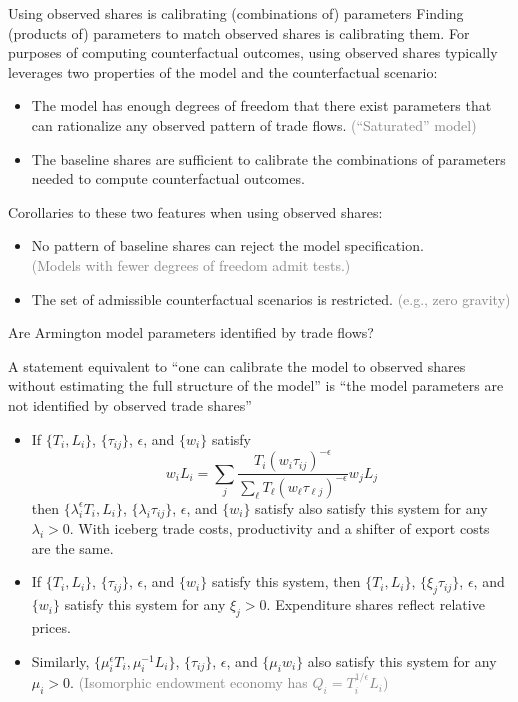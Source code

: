 \documentclass[11pt,notes=hide,aspectratio=169]{beamer}
\begin{document}
\begin{frame}{Using observed shares is calibrating (combinations of) parameters}
Finding (products of) parameters to match observed shares is calibrating them.
\medskip
For purposes of computing counterfactual outcomes, using observed shares typically leverages two properties of the model and the counterfactual scenario:
\begin{itemize}
\item
The model has enough degrees of freedom that there exist parameters that can rationalize any observed pattern of trade flows.
\textcolor{gray}{(``Saturated'' model)}
\item
The baseline shares are sufficient to calibrate the combinations of parameters needed to compute counterfactual outcomes.
\end{itemize}
\medskip
Corollaries to these two features when using observed shares:
\begin{itemize}
\item
No pattern of baseline shares can reject the model specification.\\
\textcolor{gray}{(Models with fewer degrees of freedom admit tests.)}
\item
The set of admissible counterfactual scenarios is restricted.
\textcolor{gray}{(e.g., zero gravity)}
\end{itemize}
\end{frame}
\begin{frame}{Are Armington model parameters identified by trade flows?}
{\small
A statement equivalent to
``one can calibrate the model to observed shares without estimating the full structure of the model''
is
``the model parameters are not identified by observed trade shares''
\begin{itemize}
\item
If $\{T_i,L_i\}$, $\{\tau_{ij}\}$, $\epsilon$, and $\{w_i\}$ satisfy
$$
w_i L_i
=
\sum_j \frac{T_i \left(w_i \tau_{ij}\right)^{-\epsilon}}{\sum_{\ell} T_{\ell} \left(w_{\ell} \tau_{\ell j}\right)^{-\epsilon}}
w_j L_j
$$
then
$\{\lambda_i^{\epsilon}T_i,L_i\}$, $\{\lambda_i\tau_{ij}\}$, $\epsilon$, and $\{w_i\}$ satisfy
also satisfy this system
for any $\lambda_{i} > 0$.
With iceberg trade costs, productivity and a shifter of export costs are the same.
\item
If $\{T_i,L_i\}$, $\{\tau_{ij}\}$, $\epsilon$, and $\{w_i\}$ satisfy this system,
then
$\{T_i,L_i\}$, $\{\xi_j \tau_{ij}\}$, $\epsilon$, and $\{w_i\}$ satisfy this system
for any $\xi_j > 0$.
Expenditure shares reflect relative prices.
\item
Similarly,
$\{\mu_{i}^{\epsilon}T_i,\mu_{i}^{-1} L_i\}$, $\{\tau_{ij}\}$, $\epsilon$, and $\{\mu_{i}w_i\}$
also satisfy this system
for any $\mu_{i} > 0$.
\textcolor{gray}{(Isomorphic endowment economy has $Q_i = T_i^{1/\epsilon} L_i$)}
\end{itemize}
}
\end{frame}
\end{document}
